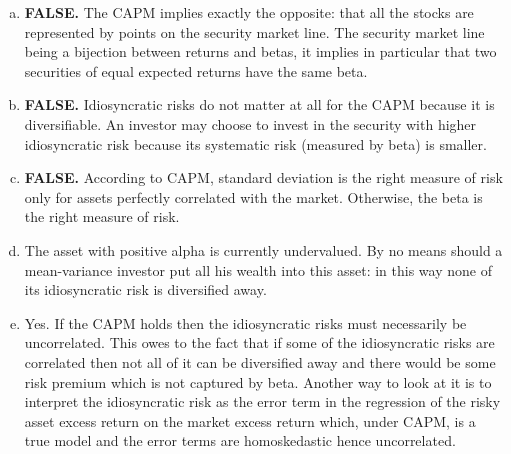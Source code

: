 \documentclass[10pt]{article}
\newenvironment{exercise}[2][Exercise]{\begin{trivlist}
  \item[\hskip \labelsep {\bfseries #1}\hskip \labelsep {\bfseries #2.}]}{\end{trivlist}}
\begin{document}
\begin{exercise}{3}
  \begin{enumerate}[(a)]
    \item
      \textbf{FALSE.} The CAPM implies exactly the opposite: that all the stocks
      are represented by points on the security market line. The security market
      line being a bijection between returns and betas, it implies in particular
      that two securities of equal expected returns have the same beta.
    \item
      \textbf{FALSE.} Idiosyncratic risks do not matter at all for the CAPM
      because it is diversifiable. An investor may choose to invest in the
      security with higher idiosyncratic risk because its systematic risk
      (measured by beta) is smaller.

    \item
      \textbf{FALSE.} According to CAPM, standard deviation is the right measure
      of risk only for assets perfectly correlated with the market. Otherwise,
      the beta is the right measure of risk.
    \item
      The asset with positive alpha is currently undervalued. By no means should
      a mean-variance investor put all his wealth into this asset: in this way
      none of its idiosyncratic risk is diversified away.
      \item
        Yes. If the CAPM holds then the idiosyncratic risks must necessarily be
        uncorrelated. This owes to the fact that if some of the idiosyncratic
        risks are correlated then not all of it can be diversified away and
        there would be some risk premium which is not captured by beta. Another
        way to look at it is to interpret the idiosyncratic risk as the error term in the
        regression of the risky asset excess return on the market excess return which,
        under CAPM, is a true model and the error terms are homoskedastic hence uncorrelated.
  \end{enumerate}
\end{exercise}

\newpage
\end{document}
